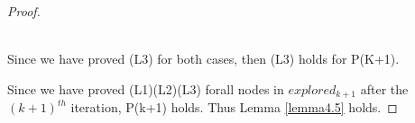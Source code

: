 \begin{proof}
\begin{itemize}
\begin{enumerate}
  \\
  Since we have proved (L3) for both cases, then (L3) holds for P(K+1). 
  \end{enumerate}
\end{itemize}
Since we have proved (L1)(L2)(L3) forall nodes in $explored_{k+1}$ after the $(k+1)^{th}$ iteration, P(k+1) holds. Thus Lemma \ref{lemma4.5} holds. 
\end{proof}